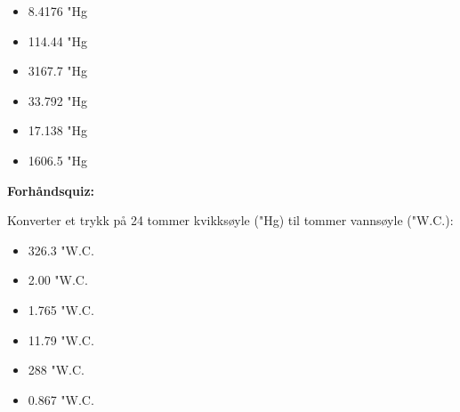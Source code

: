 \begin{itemize}
\item{} 8.4176 "Hg
\vskip 5pt
\item{} 114.44 "Hg
\vskip 5pt
\item{} 3167.7 "Hg
\vskip 5pt
\item{} 33.792 "Hg
\vskip 5pt
\item{} 17.138 "Hg
\vskip 5pt
\item{} 1606.5 "Hg
\end{itemize}



\vfil \eject

\noindent
{\bf Forhåndsquiz:}

Konverter et trykk på 24 tommer kvikksøyle ("Hg) til tommer vannsøyle ("W.C.):

\begin{itemize}
\item{} 326.3 "W.C.
\vskip 5pt
\item{} 2.00 "W.C.
\vskip 5pt
\item{} 1.765 "W.C.
\vskip 5pt
\item{} 11.79 "W.C.
\vskip 5pt
\item{} 288 "W.C.
\vskip 5pt
\item{} 0.867 "W.C.
\end{itemize}



